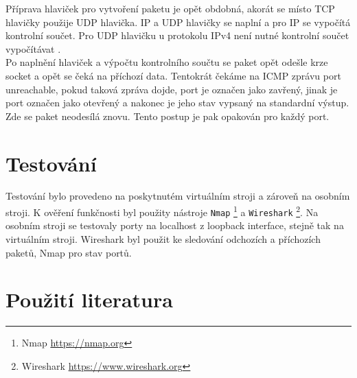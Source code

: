 \documentclass[a4paper, 11pt]{article}
\begin{document}
\noindent Příprava hlaviček pro vytvoření paketu je opět obdobná, akorát se místo TCP hlavičky použije UDP hlavička. IP a UDP hlavičky se naplní a pro IP se vypočítá kontrolní součet. Pro UDP hlavičku u protokolu IPv4 není nutné kontrolní součet vypočítávat \cite{udpchecksum}.\\

\noindent Po naplnění hlaviček a výpočtu kontrolního součtu se paket opět odešle krze socket a opět se čeká na příchozí data. Tentokrát čekáme na ICMP zprávu port unreachable, pokud taková zpráva dojde, port je označen jako zavřený, jinak je port označen jako otevřený a nakonec je jeho stav vypsaný na standardní výstup. Zde se paket neodesílá znovu. Tento postup je pak opakován pro každý port.

\section{Testování}
Testování bylo provedeno na poskytnutém virtuálním stroji a zároveň na osobním stroji. K ověření funkčnosti byl použity nástroje \texttt{Nmap} \footnote{Nmap \url{https://nmap.org}} a \texttt{Wireshark} \footnote{Wireshark \url{https://www.wireshark.org}}. Na osobním stroji se testovaly porty na localhost z loopback interface, stejně tak na virtuálním stroji. Wireshark byl použit ke sledování odchozích a příchozích paketů, Nmap pro stav portů.

\newpage
\section{Použití literatura}
\renewcommand{\refname}{}

	
\end{document}
